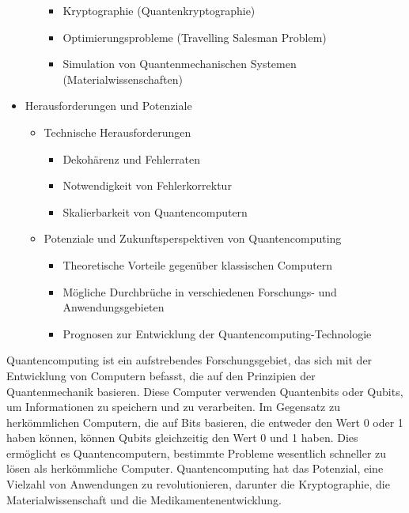 \begin{itemize}
\begin{itemize}
                \begin{itemize}
                    \item Kryptographie (Quantenkryptographie)
                    \item Optimierungsprobleme (Travelling Salesman Problem)
                    \item Simulation von Quantenmechanischen Systemen (Materialwissenschaften)
                \end{itemize}
        \end{itemize}
    \item Herausforderungen und Potenziale
        \begin{itemize}
            \item Technische Herausforderungen
                \begin{itemize}
                    \item Dekohärenz und Fehlerraten
                    \item Notwendigkeit von Fehlerkorrektur
                    \item Skalierbarkeit von Quantencomputern
                \end{itemize}
            \item Potenziale und Zukunftsperspektiven von Quantencomputing
                \begin{itemize}
                    \item Theoretische Vorteile gegenüber klassischen Computern
                    \item Mögliche Durchbrüche in verschiedenen Forschungs- und Anwendungsgebieten
                    \item Prognosen zur Entwicklung der Quantencomputing-Technologie
                \end{itemize}
        \end{itemize}
\end{itemize}

Quantencomputing ist ein aufstrebendes Forschungsgebiet, das sich mit der Entwicklung von
Computern befasst, die auf den Prinzipien der Quantenmechanik basieren. Diese Computer
verwenden Quantenbits oder Qubits, um Informationen zu speichern und zu verarbeiten. Im
Gegensatz zu herkömmlichen Computern, die auf Bits basieren, die entweder den Wert 0 oder
1 haben können, können Qubits gleichzeitig den Wert 0 und 1 haben. Dies ermöglicht es
Quantencomputern, bestimmte Probleme wesentlich schneller zu lösen als herkömmliche
Computer. Quantencomputing hat das Potenzial, eine Vielzahl von Anwendungen zu
revolutionieren, darunter die Kryptographie, die Materialwissenschaft und die
Medikamentenentwicklung.

